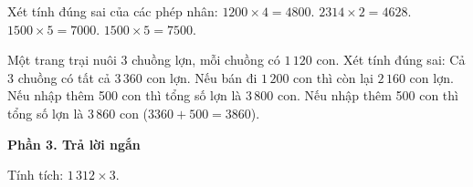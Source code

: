 \begin{ex} %
Xét tính đúng sai của các phép nhân:
\choiceTF
{\True $1200 \times 4 = 4800$.}
{\True $2314 \times 2 = 4628$.}
{$1500 \times 5 = 7000$.}
{\True $1500 \times 5 = 7500$.}
\end{ex}

\begin{ex} %
Một trang trại nuôi 3 chuồng lợn, mỗi chuồng có $1\,120$ con. Xét tính đúng sai:
\choiceTF
{\True Cả 3 chuồng có tất cả $3\,360$ con lợn.}
{\True Nếu bán đi $1\,200$ con thì còn lại $2\,160$ con lợn.}
{Nếu nhập thêm 500 con thì tổng số lợn là $3\,800$ con.}
{\True Nếu nhập thêm 500 con thì tổng số lợn là $3\,860$ con ($3360 + 500 = 3860$).}
\end{ex}

\textbf{Phần 3. Trả lời ngắn}

\begin{ex} %
Tính tích: $1\,312 \times 3$.
\end{ex}

